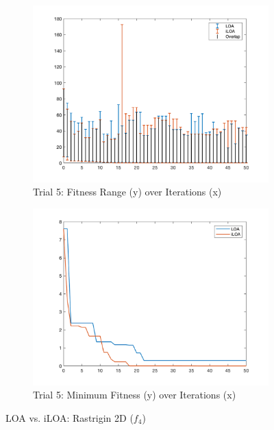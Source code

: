 \begin{figure}
  \begin{subfigure}[b]{0.4\textwidth}
    \includegraphics[width=\textwidth]{img/bars/f4/5}
    \caption{ \scriptsize Trial 5: Fitness Range (y) over Iterations (x)}
    \label{fig:f4-b-5}
  \end{subfigure}
  \begin{subfigure}[b]{0.4\textwidth}
    \includegraphics[width=\textwidth]{img/fits/f4/5}
    \caption{ \scriptsize Trial 5: Minimum Fitness (y) over Iterations (x)}
    \label{fig:f4-f-5}
  \end{subfigure}

  \caption{ \scriptsize LOA vs. iLOA: Rastrigin 2D ($f_4$)}
\end{figure}

